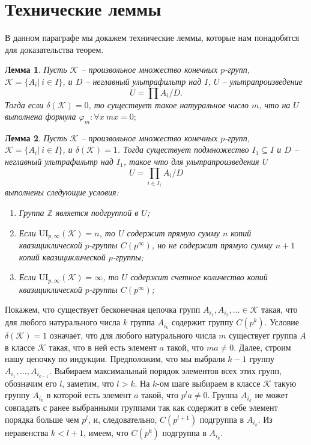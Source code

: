 \documentclass[a4paper,11pt,twoside]{article}
\newtheorem{lemma}{Лемма}[section]
\def\proof{{\noindent{\bf Доказательство.}} }
\def\K{{\mathcal{K}}}
\def\Z{{\mathbb{Z}}}
\def\ui{{\mathrm{UI}}}
\begin{document}
\section{Технические леммы}\label{sec:lemmas}

В данном параграфе мы докажем технические леммы, которые нам понадобятся для доказательства теорем. 


\begin{lemma}
Пусть $\K$ -- произвольное множество конечных $p$-групп, $\K = \{A_i | \ i \in I\}$, и $D$ -- неглавный ультрафильтр над $I$, $U$ -- ультрапроизведение 
$$U = \prod A_i \Big/ D.$$
Тогда если $\delta(\K) = 0$, то существует такое натуральное число $m$, что на $U$ выполнена формула $\varphi_m: \forall x \ mx = 0;$
\end{lemma}

\proof


\begin{lemma}\label{lemma:delta1UltraProduct}
Пусть $\K$ -- произвольное множество конечных $p$-групп, $\K = \{A_i | \ i \in I\}$, и $\delta(\K) = 1$. Тогда существует подмножество $I_1 \subseteq I$ и $D$ -- неглавный ультрафильтр над $I_1$, такое что для ультрапроизведения $U$
$$U = \prod_{i \in I_1} A_i \Big/ D$$
выполнены следующие условия:
\begin{enumerate}
\item Группа $\Z$ является подгруппой в $U$;
\item Если $\ui_{p,\infty}(\K) = n$, то $U$ содержит прямую сумму $n$ копий квазициклической $p$-группы $C(p^\infty)$, но не содержит прямую сумму $n+1$ копий квазициклической $p$-группы;
\item Если $\ui_{p,\infty}(\K) = \infty$, то $U$ содержит счетное количество копий квазициклической $p$-группы $C(p^\infty)$;
\end{enumerate}
\end{lemma}

\proof Покажем, что существует бесконечная цепочка групп $A_{i_1}, A_{i_2}, \ldots \in \K$ такая, что для любого натурального числа $k$ группа $A_{i_k}$ содержит группу $C(p^k)$. Условие $\delta(\K) = 1$ означает, что для любого натурального числа $m$ существует группа $A$ в классе $\K$ такая, что в ней есть элемент $a$ такой, что $ma \neq 0$. Далее, строим нашу цепочку по индукции. Предположим, что мы выбрали $k-1$ группу $A_{i_1}, \ldots, A_{i_{k-1}}$. Выбираем максимальный порядок элементов всех этих групп, обозначим его $l$, заметим, что $l > k$. На $k$-ом шаге выбираем в классе $\K$ такую группу $A_{i_k}$ в которой есть элемент $a$ такой, что $p^{l} a \neq 0$. Группа $A_{i_k}$ не может совпадать с ранее выбранными группами так как содержит в себе элемент порядка больше чем $p^l$, и, следовательно, $C(p^{l+1})$ подгруппа в $A_{i_k}$. Из неравенства $k < l+1$, имеем, что $C(p^k)$ подгруппа в $A_{i_k}$.
\end{document}
